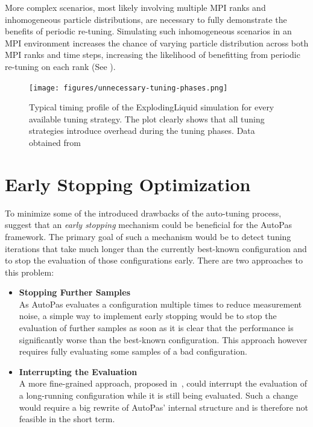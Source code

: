 \documentclass[conference]{IEEEtran}
\begin{document}
More complex scenarios, most likely involving multiple MPI ranks and inhomogeneous particle distributions, are necessary to fully demonstrate the benefits of periodic re-tuning. Simulating such inhomogeneous scenarios in an MPI environment increases the chance of varying particle distribution across both MPI ranks and time steps, increasing the likelihood of benefitting from periodic re-tuning on each rank (See \cite{Newcome2023Poster}).

\begin{figure}[h]
    \centering
    \texttt{[image: figures/unnecessary-tuning-phases.png]}
    \caption{
        Typical timing profile of the ExplodingLiquid simulation for every available tuning strategy. The plot clearly shows that all tuning strategies introduce overhead during the tuning phases. Data obtained from \cite{lerchner2024}
    }
    \label{fig:unnecessary-tuning-phases}
\end{figure}

\newpage

\section{Early Stopping Optimization}
\label{sec:early-stopping}

To minimize some of the introduced drawbacks of the auto-tuning process, \cite{endreport.pdf}\cite{Manuel_Lerchner_Thesis.pdf}\cite{autopas_issue673} suggest that an \textit{early stopping} mechanism could be beneficial for the AutoPas framework. The primary goal of such a mechanism would be to detect tuning iterations that take much longer than the currently best-known configuration and to stop the evaluation of those configurations early. There are two approaches to this problem:


\begin{itemize}
    \item \textbf{Stopping Further Samples}\\
          As AutoPas evaluates a configuration multiple times to reduce measurement noise, a simple way to implement early stopping would be to stop the evaluation of further samples as soon as it is clear that the performance is significantly worse than the best-known configuration. This approach however requires fully evaluating some samples of a bad configuration.
    \item \textbf{Interrupting the Evaluation}\\
          A more fine-grained approach, proposed in~\cite{endreport.pdf}, could interrupt the evaluation of a long-running configuration while it is still being evaluated. Such a change would require a big rewrite of AutoPas' internal structure and is therefore not feasible in the short term.
\end{itemize}
\end{document}
